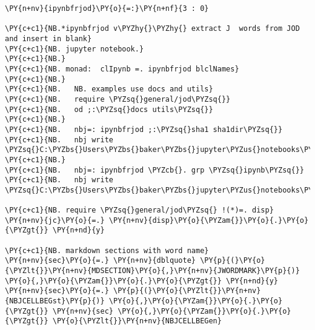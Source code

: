  \begin{tcolorbox}[breakable, size=fbox, boxrule=1pt, pad at break*=1mm,colback=cellbackground, colframe=cellborder]
\begin{Verbatim}[commandchars=\\\{\}]
\PY{n+nv}{ipynbfrjod}\PY{o}{=:}\PY{n+nf}{3 : 0}

\PY{c+c1}{NB.*ipynbfrjod v\PYZhy{}\PYZhy{} extract J  words from JOD  and insert in blank}
\PY{c+c1}{NB. jupyter notebook.}
\PY{c+c1}{NB.}
\PY{c+c1}{NB. monad:  clIpynb =. ipynbfrjod blclNames}
\PY{c+c1}{NB.}
\PY{c+c1}{NB.   NB. examples use docs and utils}
\PY{c+c1}{NB.   require \PYZsq{}general/jod\PYZsq{}}
\PY{c+c1}{NB.   od ;:\PYZsq{}docs utils\PYZsq{}}
\PY{c+c1}{NB.}
\PY{c+c1}{NB.   nbj=: ipynbfrjod ;:\PYZsq{}sha1 sha1dir\PYZsq{}}
\PY{c+c1}{NB.   nbj write \PYZsq{}C:\PYZbs{}Users\PYZbs{}baker\PYZbs{}jupyter\PYZus{}notebooks\PYZbs{}test0.ipynb\PYZsq{}}
\PY{c+c1}{NB.}
\PY{c+c1}{NB.   nbj=: ipynbfrjod \PYZcb{}. grp \PYZsq{}ipynb\PYZsq{}}
\PY{c+c1}{NB.   nbj write \PYZsq{}C:\PYZbs{}Users\PYZbs{}baker\PYZbs{}jupyter\PYZus{}notebooks\PYZbs{}ipynb\PYZus{}onself.ipynb\PYZsq{}}

\PY{c+c1}{NB. require \PYZsq{}general/jod\PYZsq{} !(*)=. disp}
\PY{n+nv}{jc}\PY{o}{=.} \PY{n+nv}{disp}\PY{o}{\PYZam{}}\PY{o}{.}\PY{o}{\PYZgt{}} \PY{n+nd}{y}

\PY{c+c1}{NB. markdown sections with word name}
\PY{n+nv}{sec}\PY{o}{=.} \PY{n+nv}{dblquote} \PY{p}{(}\PY{o}{\PYZlt{}}\PY{n+nv}{MDSECTION}\PY{o}{,}\PY{n+nv}{JWORDMARK}\PY{p}{)} \PY{o}{,}\PY{o}{\PYZam{}}\PY{o}{.}\PY{o}{\PYZgt{}} \PY{n+nd}{y}
\PY{n+nv}{sec}\PY{o}{=.} \PY{p}{(}\PY{o}{\PYZlt{}}\PY{n+nv}{NBJCELLBEGst}\PY{p}{)} \PY{o}{,}\PY{o}{\PYZam{}}\PY{o}{.}\PY{o}{\PYZgt{}} \PY{n+nv}{sec} \PY{o}{,}\PY{o}{\PYZam{}}\PY{o}{.}\PY{o}{\PYZgt{}} \PY{o}{\PYZlt{}}\PY{n+nv}{NBJCELLBEGen}


\end{Verbatim}
\end{tcolorbox}
